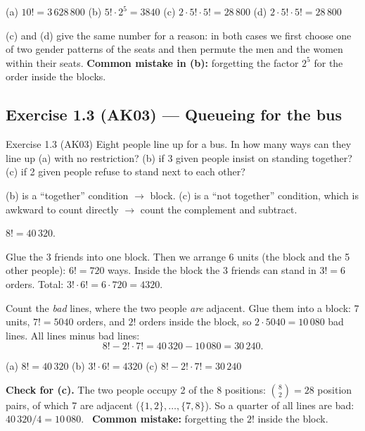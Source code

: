 	\begin{answer}
		(a) $10!=3\,628\,800$ \quad (b) $5!\cdot2^5=3840$ \quad
		(c) $2\cdot5!\cdot5!=28\,800$ \quad (d) $2\cdot5!\cdot5!=28\,800$
	\end{answer}

	\begin{remark}
		(c) and (d) give the same number for a reason: in both cases we first
		choose one of two gender patterns of the seats and then permute the men and
		the women within their seats. \textbf{Common mistake in (b):} forgetting
		the factor $2^5$ for the order inside the blocks.
	\end{remark}
\fi

\subsection{Exercise 1.3 (AK03) --- Queueing for the bus}

\begin{task}{Exercise 1.3 (AK03)}
	Eight people line up for a bus. In how many ways can they line up (a) with
	no restriction? (b) if 3 given people insist on standing together? (c) if 2
	given people refuse to stand next to each other?
\end{task}
\workspace{3.5cm}

\ifsolutions
	\soltitle
	\idea (b) is a ``together'' condition $\to$ block. (c) is a ``not
	together'' condition, which is awkward to count directly $\to$ count the
	complement and subtract.

	 $8! = 40\,320$.

	 Glue the 3 friends into one block. Then we arrange 6 units (the
	block and the 5 other people): $6!=720$ ways. Inside the block the 3 friends
	can stand in $3!=6$ orders. Total: $3!\cdot6! = 6\cdot720 = 4320$.

	 Count the \emph{bad} lines, where the two people \emph{are}
	adjacent. Glue them into a block: $7$ units, $7!=5040$ orders, and $2!$
	orders inside the block, so $2\cdot5040=10\,080$ bad lines. All lines minus
	bad lines:
	\[ 8!-2!\cdot7! = 40\,320-10\,080 = 30\,240. \]

	\begin{answer}
		(a) $8!=40\,320$ \quad (b) $3!\cdot6!=4320$ \quad
		(c) $8!-2!\cdot7!=30\,240$
	\end{answer}

	\begin{remark}
		\textbf{Check for (c).} The two people occupy 2 of the 8 positions:
		$\binom82=28$ position pairs, of which 7 are adjacent ($\{1,2\},\dots,
			\{7,8\}$). So a quarter of all lines are bad: $40\,320/4=10\,080$. \
		\textbf{Common mistake:} forgetting the $2!$ inside the block.
	\end{remark}
\fi

